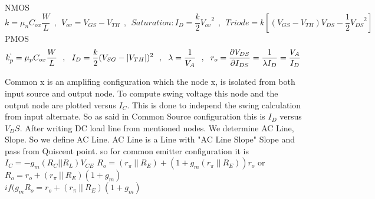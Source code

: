 NMOS
$$ k = {\mu}_n C_{ox} \frac{W}{L} ~~ , ~~ V_{ov} = V_{GS} - V_{TH} ~~, ~~  Saturation: I_D = \frac{k}{2} {V_{ov}}^2 ~~,~~ Triode = k [(V_{GS} - V_{TH})V_{DS} - \frac{1}{2}{V_{DS}}^2]$$
PMOS
$$ k^{`}_p = {\mu}_p C_{ox} \frac{W}{L} ~~, ~~ I_D = \frac{k}{2} (V_{SG} - |V_{TH}|)^2 ~~,~~ 
\lambda = \frac{1}{V_A} ~~, ~~ r_o = \frac{\partial V_{DS}}{\partial I_{DS}} = \frac{1}{\lambda  I_D} = \frac{V_A}{I_D}$$
\setlength{\parindent}{0.5cm} %
\par
Common x is an amplifing configuration which the node x, is isolated from both input source and output node. To compute swing voltage this node and the output node are plotted versus $I_C$. This is done to independ the swing calculation from input alternate. So as said in Common Source configuration this is $I_D$ versus $V_DS$. After writing DC load line from mentioned nodes. We determine AC Line, Slope. So we define AC Line. AC Line is a Line with "AC Line Slope" Slope and pass from Quiscent point. so for common emitter configuration it is $ I_C = - g_m ( R_C || R_L ) V_{CE} $
\lipsum[1-2]
\setlength{\parindent}{0.0cm} 
$ R_o = (r_\pi ~||~ R_E) + ( 1 + g_m (r_\pi ~||~ R_E) )r_o$ or \\
$ R_o = r_o + (r_\pi ~||~ R_E)( 1 + g_m  )$ \\
$ if ( g_m R_o = r_o + (r_\pi ~||~ R_E)( 1 + g_m  )$ \\
\begin{minipage}[t]{.5\textwidth}
\\
\end{minipage}%
\noindent
\setlength{\parindent}{0.0cm} 
\hspace*{-\parindent}%
\begin{minipage}[b]{.5\textwidth}
\raggedleft

\end{minipage}%
